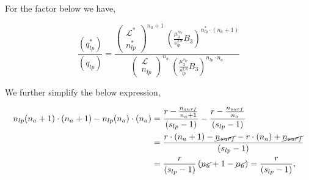 \documentclass[12pt,letterpaper]{article}
\newcommand{\leng}{\mathcal{L}}
\newcommand{\lr}[1]{\left( #1 \right)}
\begin{document}
For the factor below we have, 

\begin{equation}
\frac{
    \lr{
        q_{lp}^{*}
    }
}{
    \lr{
        q_{lp}
    }
}
=
\frac{
        \lr{
        \begin{array}{c}
             \leng^{*}\\
             n_{lp}^{*}
        \end{array}
        }^{n_a+1}   
        ~
        \lr{
                    \frac{
                        \mu_3^{
                            s_{lp}
                        }
                    }{
                        s_{lp}^{2.8}
                    }
                    B_3
                }
                ^{
                    n_{lp}^{*}\cdot (n_a+1)
                }
}{
        \lr{
        \begin{array}{c}
             \leng\\
             n_{lp} 
        \end{array}
        }^{n_a}   
        ~
        \lr{
                    \frac{
                        \mu_3^{
                            s_{lp}
                        }
                    }{
                        s_{lp}^{2.8}
                    }
                    B_3
                }
                ^{
                    n_{lp}\cdot n_a            
        }
}
\label{Eq: qlpoverqlp}
\end{equation}

We further simplify the below expression,


\begin{align}
n_{lp}(n_a+1)
\cdot
(n_a+1)
-
n_{lp}(n_a)
\cdot
(n_a)
&=
\frac{
    r
    -
    \frac{
            n_{surf}
        }{
            n_a+1
    }
}{
    (s_{lp}-1)
}
-
\frac{
    r
    -
    \frac{
        n_{surf}
    }{
        n_a
    }
}{
    (s_{lp}-1)
}\nonumber\\
&=
\frac{
    r\cdot (n_a+1)
    -
    \cancel{
        n_{surf}
    }
    -
    r\cdot (n_a)
    +
    \cancel{
        n_{surf}
    }
}{
    (s_{lp}-1)
} \\
&=
\frac{
    r
}{
    (s_{lp}-1)
}
\lr{
    \cancel{
        n_a
    }
    +
    1
    -
    \cancel{
        n_a
    }
}
=
\frac{
    r
}{
    (s_{lp}-1)
},\nonumber
\end{align}
\end{document}
